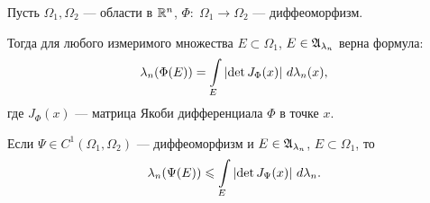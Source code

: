 
\begin{thm}[%
]
\label{theorem:measure_of_smooth_image}
 Пусть $\Omega_1, \Omega_2$ --- области в $\mathbb{R}^{n}$, $\Phi \colon\; \Omega_1 \to \Omega_2$ --- диффеоморфизм. 

 Тогда для любого измеримого множества $E \subset \Omega_1$, $E \in \mathfrak{A}_{\lambda_n}$ верна формула:
 \begin{align*}
  \lambda_n(\Phi(E)) = \int\limits_{E} \left| \det J_{\Phi}(x) \right| \, d\lambda_n(x)  
 ,\end{align*} где $J_{\Phi}(x)$ --- матрица Якоби дифференциала $\Phi$ в точке $x$.
\end{thm}
\begin{lm}
 \label{lemma:measure_of_smooth_image_leq}
 Если $\Psi \in C^{1}(\Omega_1, \Omega_2)$ --- диффеоморфизм и $E \in \mathfrak{A}_{\lambda_n}$, $E \subset \Omega_1$, то \begin{align*}
  \lambda_n(\Psi(E)) \leqslant \int\limits_{E} \left| \det J_{\Psi}(x) \right| \, d\lambda_n
 .\end{align*} 
\end{lm}
